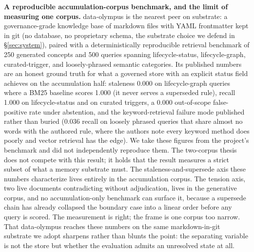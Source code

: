 \documentclass[11pt]{article}
\begin{document}
\textbf{A reproducible accumulation-corpus benchmark, and the limit of measuring one corpus.}
data-olympus \citep{dataolympus2026} is the nearest peer on substrate: a governance-grade knowledge
base of markdown files with YAML frontmatter kept in git (no database, no proprietary schema,
the substrate choice we defend in \S\ref{sec:system}), paired with a deterministically reproducible
retrieval benchmark of 250 generated concepts and 500 queries spanning lifecycle-status,
lifecycle-graph, curated-trigger, and loosely-phrased semantic categories. Its published
numbers are an honest ground truth for what a governed store with an explicit status field
achieves on the accumulation half: staleness 0.000 on lifecycle-graph queries where a BM25
baseline scores 1.000 (it never serves a superseded rule), recall 1.000 on lifecycle-status
and on curated triggers, a 0.000 out-of-scope false-positive rate under abstention, and the
keyword-retrieval failure mode published rather than buried (0.036 recall on loosely phrased
queries that share almost no words with the authored rule, where the authors note every
keyword method does poorly and vector retrieval has the edge). We take these figures from the
project's benchmark and did not independently reproduce them. The two-corpus thesis does not
compete with this result; it holds that the result measures a strict subset of what a memory
substrate must. The staleness-and-supersede axis these numbers characterize lives entirely in
the accumulation corpus. The tension axis, two live documents contradicting without
adjudication, lives in the generative corpus, and no accumulation-only benchmark can surface
it, because a supersede chain has already collapsed the boundary case into a linear order
before any query is scored. The measurement is right; the frame is one corpus too narrow. That
data-olympus reaches these numbers on the same markdown-in-git substrate we adopt sharpens
rather than blunts the point: the separating variable is not the store but whether the
evaluation admits an unresolved state at all.
\end{document}
